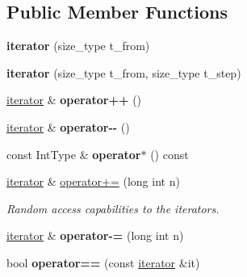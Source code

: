 \subsection*{Public Member Functions}
\begin{DoxyCompactItemize}
\item 
\hypertarget{classdscr_1_1range_1_1iterator_ad5739009b166911bcb779206a4d5bbbb}{{\bfseries iterator} (size\-\_\-type t\-\_\-from)}\label{classdscr_1_1range_1_1iterator_ad5739009b166911bcb779206a4d5bbbb}

\item 
\hypertarget{classdscr_1_1range_1_1iterator_aa906c38a3b44ef70646a07f947da361d}{{\bfseries iterator} (size\-\_\-type t\-\_\-from, size\-\_\-type t\-\_\-step)}\label{classdscr_1_1range_1_1iterator_aa906c38a3b44ef70646a07f947da361d}

\item 
\hypertarget{classdscr_1_1range_1_1iterator_aa0cca1019fe8ceb036372e18964c2049}{\hyperlink{classdscr_1_1range_1_1iterator}{iterator} \& {\bfseries operator++} ()}\label{classdscr_1_1range_1_1iterator_aa0cca1019fe8ceb036372e18964c2049}

\item 
\hypertarget{classdscr_1_1range_1_1iterator_a1aba58c2b46819f4461bdf1e37dc295d}{\hyperlink{classdscr_1_1range_1_1iterator}{iterator} \& {\bfseries operator-\/-\/} ()}\label{classdscr_1_1range_1_1iterator_a1aba58c2b46819f4461bdf1e37dc295d}

\item 
\hypertarget{classdscr_1_1range_1_1iterator_a3a3522b36fd251dec273c9929893eaae}{const Int\-Type \& {\bfseries operator$\ast$} () const }\label{classdscr_1_1range_1_1iterator_a3a3522b36fd251dec273c9929893eaae}

\item 
\hyperlink{classdscr_1_1range_1_1iterator}{iterator} \& \hyperlink{classdscr_1_1range_1_1iterator_a33c9bfae559f304396651e146bef86dd}{operator+=} (long int n)
\begin{DoxyCompactList}\small\item\em Random access capabilities to the iterators. \end{DoxyCompactList}\item 
\hypertarget{classdscr_1_1range_1_1iterator_aac567b57428445fbdd91e0a18ca76509}{\hyperlink{classdscr_1_1range_1_1iterator}{iterator} \& {\bfseries operator-\/=} (long int n)}\label{classdscr_1_1range_1_1iterator_aac567b57428445fbdd91e0a18ca76509}

\item 
\hypertarget{classdscr_1_1range_1_1iterator_a95c26706e52ca57f186accc005fe1dbb}{bool {\bfseries operator==} (const \hyperlink{classdscr_1_1range_1_1iterator}{iterator} \&it)}\label{classdscr_1_1range_1_1iterator_a95c26706e52ca57f186accc005fe1dbb}


\end{DoxyCompactItemize}
